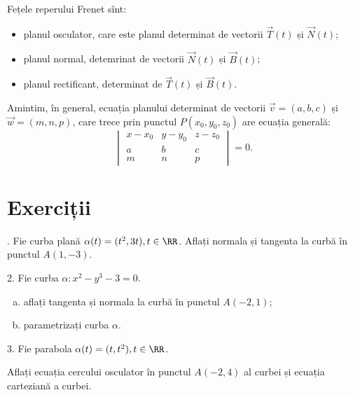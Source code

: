 Fețele reperului Frenet sînt:
\begin{itemize}
  \item planul osculator, care este planul determinat de vectorii $ \vec{T}(t) $ și $ \vec{N}(t) $;
  \item planul normal, detemrinat de vectorii $ \vec{N}(t)$ și $\vec{B}(t) $;
  \item planul rectificant, determinat de $ \vec{T}(t) $ și $ \vec{B}(t) $.
\end{itemize}

\begin{remark}\label{rk:plan-vectori-punct}
  Amintim, în general, ecuația planului determinat de vectorii $ \vec{v} = (a, b, c) $ și
  $ \vec{w} = (m, n, p) $, care trece prin punctul $ P(x_0, y_0, z_0) $ are ecuația
  generală:
  \[
    \begin{vmatrix}
      x - x_0 & y - y_0 & z - z_0 \\
      a & b & c \\
      m & n & p
    \end{vmatrix} = 0.
  \]
\end{remark}


\section{Exerciții}

\indent{}. Fie curba plană $ \alpha(t) = (t^2, 3t), t \in \RR $. 
Aflați normala și tangenta la curbă în punctul $ A(1, -3) $.

\vspace{1cm}

2. Fie curba $ \alpha : x^2 - y^3 - 3 = 0 $.
\begin{enumerate}[(a)]
  \item aflați tangenta și normala la curbă în punctul $ A(-2, 1) $;
  \item parametrizați curba $ \alpha $.
\end{enumerate}

\vspace{1cm}

3. Fie parabola $ \alpha(t) = (t, t^2), t \in \RR $.

Aflați ecuația cercului osculator în punctul $ A(-2, 4) $ al curbei și ecuația
carteziană a curbei.

\vspace{1cm}

